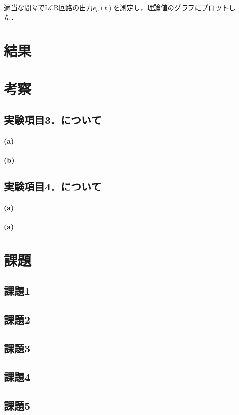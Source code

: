 \documentclass{jlreq}
\begin{document}
\subsection{}
適当な間隔でLCR回路の出力$e_o(t)$を測定し，理論値のグラフにプロットした．

\section{結果}

\section{考察}
\subsection{実験項目3．について}
\paragraph*{(a)}
\paragraph*{(b)}

\subsection{実験項目4．について}
\paragraph*{(a)}
\paragraph*{(a)}

\section{課題}
\subsection{課題1}

\subsection{課題2}

\subsection{課題3}

\subsection{課題4}

\subsection{課題5}
\end{document}
